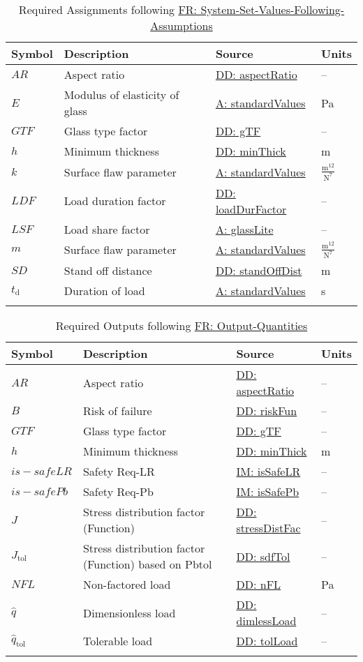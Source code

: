 \documentclass[12pt]{article}
\begin{document}
\begin{longtable}{l l l l}
\toprule
\textbf{Symbol} & \textbf{Description} & \textbf{Source} & \textbf{Units}
\\
\midrule
\endhead
$AR$ & Aspect ratio & \hyperref[DD:aspectRatio]{DD: aspectRatio} & --
\\
$E$ & Modulus of elasticity of glass & \hyperref[assumpSV]{A: standardValues} & Pa
\\
$GTF$ & Glass type factor & \hyperref[DD:gTF]{DD: gTF} & --
\\
$h$ & Minimum thickness & \hyperref[DD:minThick]{DD: minThick} & m
\\
$k$ & Surface flaw parameter & \hyperref[assumpSV]{A: standardValues} & $\frac{\text{m}^{12}}{\text{N}^{7}}$
\\
$LDF$ & Load duration factor & \hyperref[DD:loadDurFactor]{DD: loadDurFactor} & --
\\
$LSF$ & Load share factor & \hyperref[assumpGL]{A: glassLite} & --
\\
$m$ & Surface flaw parameter & \hyperref[assumpSV]{A: standardValues} & $\frac{\text{m}^{12}}{\text{N}^{7}}$
\\
$SD$ & Stand off distance & \hyperref[DD:standOffDist]{DD: standOffDist} & m
\\
${t_{\text{d}}}$ & Duration of load & \hyperref[assumpSV]{A: standardValues} & s
\\
\bottomrule
\caption{Required Assignments following \hyperref[sysSetValsFollowingAssumps]{FR: System-Set-Values-Following-Assumptions}}
\label{Table:ReqAssignments}
\end{longtable}
\begin{longtabu}{l X[l] l l}
\toprule
\textbf{Symbol} & \textbf{Description} & \textbf{Source} & \textbf{Units}
\\
\midrule
\endhead
$AR$ & Aspect ratio & \hyperref[DD:aspectRatio]{DD: aspectRatio} & --
\\
$B$ & Risk of failure & \hyperref[DD:riskFun]{DD: riskFun} & --
\\
$GTF$ & Glass type factor & \hyperref[DD:gTF]{DD: gTF} & --
\\
$h$ & Minimum thickness & \hyperref[DD:minThick]{DD: minThick} & m
\\
$is-safeLR$ & Safety Req-LR & \hyperref[IM:isSafeLR]{IM: isSafeLR} & --
\\
$is-safePb$ & Safety Req-Pb & \hyperref[IM:isSafePb]{IM: isSafePb} & --
\\
$J$ & Stress distribution factor (Function) & \hyperref[DD:stressDistFac]{DD: stressDistFac} & --
\\
${J_{\text{tol}}}$ & Stress distribution factor (Function) based on Pbtol & \hyperref[DD:sdfTol]{DD: sdfTol} & --
\\
$NFL$ & Non-factored load & \hyperref[DD:nFL]{DD: nFL} & Pa
\\
$\hat{q}$ & Dimensionless load & \hyperref[DD:dimlessLoad]{DD: dimlessLoad} & --
\\
${\hat{q}_{\text{tol}}}$ & Tolerable load & \hyperref[DD:tolLoad]{DD: tolLoad} & --
\\
\bottomrule
\caption{Required Outputs following \hyperref[outputQuants]{FR: Output-Quantities}}
\label{Table:ReqOutputs}
\end{longtabu}
\end{document}
